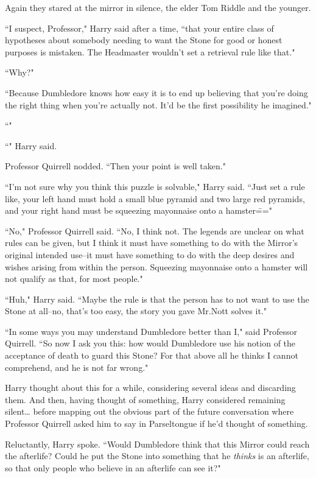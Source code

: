 Again they stared at the mirror in silence, the elder Tom Riddle and the younger.

``I suspect, Professor," Harry said after a time, ``that your entire class of hypotheses about somebody needing to want the Stone for good or honest purposes is mistaken. The Headmaster wouldn't set a retrieval rule like that."

``Why?"

``Because Dumbledore knows how easy it is to end up believing that you're doing the right thing when you're actually not. It'd be the first possibility he imagined."

``"

``" Harry said.

Professor Quirrell nodded. ``Then your point is well taken."

``I'm not sure why you think this puzzle is solvable," Harry said. ``Just set a rule like, your left hand must hold a small blue pyramid and two large red pyramids, and your right hand must be squeezing mayonnaise onto a hamster\==="

``No," Professor Quirrell said. ``No, I think not. The legends are unclear on what rules can be given, but I think it must have something to do with the Mirror's original intended use\---it must have something to do with the deep desires and wishes arising from within the person. Squeezing mayonnaise onto a hamster will not qualify as that, for most people."

``Huh," Harry said. ``Maybe the rule is that the person has to not want to use the Stone at all\---no, that's too easy, the story you gave Mr.\?Nott solves it."

``In some ways you may understand Dumbledore better than I," said Professor Quirrell. ``So now I ask you this: how would Dumbledore use his notion of the acceptance of death to guard this Stone? For that above all he thinks I cannot comprehend, and he is not far wrong."

Harry thought about this for a while, considering several ideas and discarding them. And then, having thought of something, Harry considered remaining silent{\ldots} before mapping out the obvious part of the future conversation where Professor Quirrell asked him to say in Parseltongue if he'd thought of something.

Reluctantly, Harry spoke. ``Would Dumbledore think that this Mirror could reach the afterlife? Could he put the Stone into something that he \emph{thinks} is an afterlife, so that only people who believe in an afterlife can see it?"


